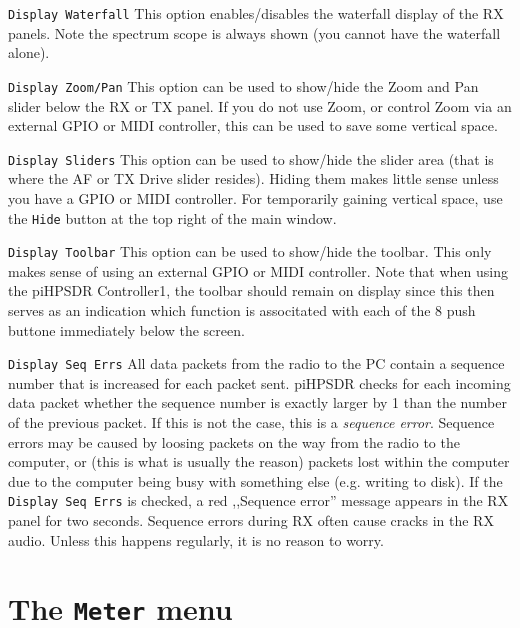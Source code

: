 \documentclass[12pt]{book}
\def\rett#1{\texttt{\color{red}#1}}
\begin{document}
 \rett{Display Waterfall} This option enables/disables the waterfall display
 of the RX panels. Note the spectrum scope is always shown (you cannot have the
 waterfall alone).
 
 \rett{Display Zoom/Pan} This option can be used to show/hide the Zoom and
 Pan slider below the RX or TX panel. If you do not use Zoom, or control
 Zoom via an external GPIO or MIDI controller, this can be used to save
 some vertical space.
 
 \rett{Display Sliders} This option can be used to show/hide the slider area
 (that is where the AF or TX Drive slider resides).
 Hiding them makes little sense unless you
 have a GPIO or MIDI controller. For temporarily gaining vertical space,
 use the \rett{Hide} button at the top right of the main window.
 
 \rett{Display Toolbar} This option can be used to show/hide the toolbar. This
 only makes sense of using an external GPIO or MIDI controller. Note that
 when using the piHPSDR Controller1, the toolbar should remain on display since
 this then serves as an indication which function is associtated with each of
 the 8 push buttone immediately below the screen.

\rett{Display Seq Errs} All data packets from the radio to the PC contain
a sequence number that is increased  for each packet sent. piHPSDR
checks for each incoming data packet whether the sequence number is 
exactly larger by 1 than the number of the previous packet. If this is not
the case, this is a \textit{sequence error}. Sequence errors may be caused
by loosing packets on the way from the radio to the computer, or
(this is what is usually the reason) packets lost within the computer due
to the computer being busy with something else (e.g. writing to disk).
 If the \rett{Display Seq Errs} is checked, a red
,,Sequence error'' message appears in the RX panel for two seconds.
Sequence errors during RX often cause cracks in the RX audio. Unless this
happens regularly, it is no reason to worry.


\section{The \texttt{Meter} menu}
\end{document}
